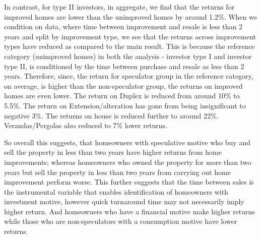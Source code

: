 \documentclass[AEJ,reqno, draftmode]{AEA} %
\begin{document}
In contrast, for type II investors, in aggregate, we find that the returns for improved homes are lower than the unimproved homes by around 1.2\%. When we condition on data, where time between improvement and resale is less than 2 years and split by improvement type, we see that the returns across improvement types have reduced as compared to the main result. This is because the reference category (unimproved homes) in both the analysis - investor type I and investor type II, is conditioned by the time between purchase and resale as less than 2 years. Therefore, since, the return for speculator group in the reference category, on average, is higher than the non-speculator group, the returns on improved homes are even lower. The return on Duplex is reduced from around 10\% to 5.5\%. The return on Extension/alteration has gone from being insignificant to negative 3\%. The returns on house is reduced further to around 22\%. Verandas/Pergolas also reduced to 7\% lower returns. 

So overall this suggests, that homeowners with speculative motive who buy and sell the property in less than two years have higher returns from home improvements; whereas homeowners who owned the property for more than two years but sell the property in less than two years from carrying out home improvement perform worse. This further suggests that the time between sales is the instrumental variable that enables identification of homeowners with investment motive, however quick turnaround time may not necessarily imply higher return. And homeowners who have a financial motive make higher returns while those who are non-speculators with a consumption motive have lower returns. 
\end{document}

